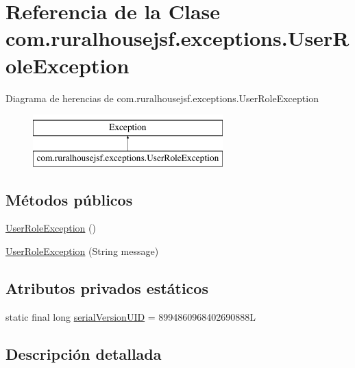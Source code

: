 \hypertarget{classcom_1_1ruralhousejsf_1_1exceptions_1_1_user_role_exception}{}\section{Referencia de la Clase com.\+ruralhousejsf.\+exceptions.\+User\+Role\+Exception}
\label{classcom_1_1ruralhousejsf_1_1exceptions_1_1_user_role_exception}
Diagrama de herencias de com.\+ruralhousejsf.\+exceptions.\+User\+Role\+Exception\begin{figure}[H]
\begin{center}
\leavevmode
\includegraphics[height=2.000000cm]{d4/d8f/classcom_1_1ruralhousejsf_1_1exceptions_1_1_user_role_exception}
\end{center}
\end{figure}
\subsection*{Métodos públicos}
\begin{DoxyCompactItemize}
\item 
\mbox{\hyperlink{classcom_1_1ruralhousejsf_1_1exceptions_1_1_user_role_exception_a8ca96b595e439045ef33ddcea0c21da2}{User\+Role\+Exception}} ()
\item 
\mbox{\hyperlink{classcom_1_1ruralhousejsf_1_1exceptions_1_1_user_role_exception_a7c888f23edf10f7c1347519b6d03752d}{User\+Role\+Exception}} (String message)
\end{DoxyCompactItemize}
\subsection*{Atributos privados estáticos}
\begin{DoxyCompactItemize}
\item 
static final long \mbox{\hyperlink{classcom_1_1ruralhousejsf_1_1exceptions_1_1_user_role_exception_a9894bada17e7192af3bfcdd028fd6c57}{serial\+Version\+U\+ID}} = 8994860968402690888L
\end{DoxyCompactItemize}


\subsection{Descripción detallada}


